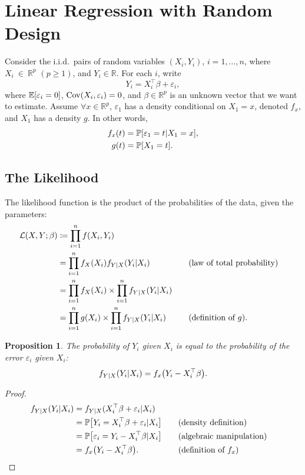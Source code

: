 \documentclass[letterpaper, reqno]{amsart}
\newtheorem{prop}{Proposition}[section]
\numberwithin{equation}{section}
\newcommand{\T}{\top} %
\newcommand{\Prob}[1]{\mathbb{P}\mleft[#1\mright]}
\newcommand{\E}[1]{\mathbb{E}\mleft[#1\mright]}
\newcommand{\Cov}[1]{\operatorname{Cov}\mleft(#1\mright)}
\newcommand{\Li}[1]{\mathcal{L}\mleft( #1 \mright)}  %
\newcommand{\R}{\mathbb{R}}  %
\newcommand{\iid}{i.i.d.}
\newcommand{\by}[1]{&\quad&\text{(#1)}}
\newcommand{\Bv}{\beta}
\newcommand{\ve}{\varepsilon}
\begin{document}




\clearpage
\section{Linear Regression with Random Design}
Consider the \iid\ pairs of random variables $(X_i, Y_i)$, $i = 1, \dots, n$,
where $X_i~\in~\R^p$ $(p \ge 1)$, and $Y_i \in \R$. For each $i$, write
\[ Y_i = X_i^\T \Bv + \ve_i, \]
where $\E{\ve_i = 0}$, $\Cov{X_i, \ve_i} = 0$, and $\Bv \in \R^p$ is an unknown
vector that we want to estimate. Assume $\forall x \in \R^p$, $\ve_1$ has
a density conditional on $X_1 = x$, denoted $f_x$, and $X_1$ has a density $g$.
In other words,
\begin{align*}
  f_x(t) &= \Prob{\ve_1 = t | X_1 = x}, \\
  g(t) &= \Prob{X_1 = t}.
\end{align*}

\subsection{The Likelihood}
The likelihood function is the product of the probabilities of the data, given
the parameters:
\begin{alignat*}{3}
  \Li{X, Y; \Bv} &\coloneqq \prod_{i=1}^n f(X_i, Y_i) \\
  &= \prod_{i=1}^n f_X(X_i) f_{Y|X}(Y_i | X_i) \by{law of total probability} \\
  &= \prod_{i=1}^n f_X(X_i) \times \prod_{i=1}^n f_{Y|X}(Y_i | X_i) \\
  &= \prod_{i=1}^n g(X_i) \times \prod_{i=1}^n f_{Y|X}(Y_i | X_i) \by{definition of $g$}.
\end{alignat*}

\begin{prop}
  The probability of $Y_i$ given $X_i$ is equal to the probability of the error
  $\ve_i$ given $X_i$:
  \[ f_{Y|X}(Y_i | X_i) = f_x\mleft(Y_i - X_i^\T\Bv\mright). \]
\end{prop}

\begin{proof}
  \begin{alignat*}{3}
    f_{Y|X}(Y_i | X_i) &= f_{Y|X}(X_i^\T \Bv + \ve_i | X_i) \\
    &= \Prob{Y_i = X_i^\T \Bv + \ve_i | X_i} \by{density definition} \\
    &= \Prob{\ve_i = Y_i - X_i^\T\Bv | X_i} \by{algebraic manipulation} \\
    &= f_x\mleft(Y_i - X_i^\T\Bv\mright). \by{definition of $f_x$} \tag*{\qedhere}
  \end{alignat*}
\end{proof}
\end{document}

